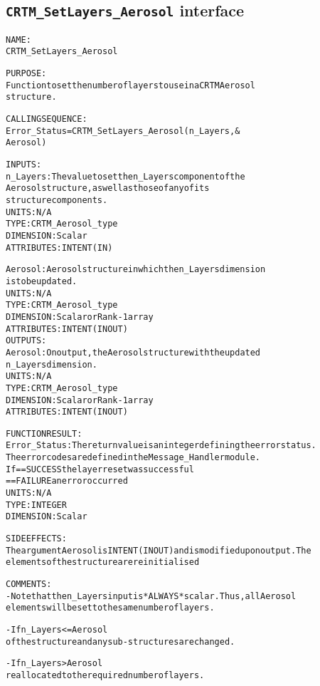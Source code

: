 \subsection{\texttt{CRTM\_SetLayers\_Aerosol} interface}
  \label{sec:CRTM_SetLayers_Aerosol_interface}
  \begin{alltt}
 
  NAME:
        CRTM_SetLayers_Aerosol
  
  PURPOSE:
        Function to set the number of layers to use in a CRTM Aerosol
        structure.
 
  CALLING SEQUENCE:
        Error_Status = CRTM_SetLayers_Aerosol( n_Layers, &
                                               Aerosol   )
 
  INPUTS:
        n_Layers:     The value to set the n_Layers component of the 
                      Aerosol structure, as well as those of any of its
                      structure components.
                      UNITS:      N/A
                      TYPE:       CRTM_Aerosol_type
                      DIMENSION:  Scalar
                      ATTRIBUTES: INTENT(IN)
 
        Aerosol:      Aerosol structure in which the n_Layers dimension
                      is to be updated.
                      UNITS:      N/A
                      TYPE:       CRTM_Aerosol_type
                      DIMENSION:  Scalar or Rank-1 array
                      ATTRIBUTES: INTENT(IN OUT)
  OUTPUTS:
        Aerosol:      On output, the Aerosol structure with the updated
                      n_Layers dimension.
                      UNITS:      N/A
                      TYPE:       CRTM_Aerosol_type
                      DIMENSION:  Scalar or Rank-1 array
                      ATTRIBUTES: INTENT(IN OUT)
 
  FUNCTION RESULT:
        Error_Status: The return value is an integer defining the error status.
                      The error codes are defined in the Message_Handler module.
                      If == SUCCESS the layer reset was successful
                         == FAILURE an error occurred
                      UNITS:      N/A
                      TYPE:       INTEGER
                      DIMENSION:  Scalar
 
  SIDE EFFECTS:
        The argument Aerosol is INTENT(IN OUT) and is modified upon output. The
        elements of the structureare reinitialised
 
  COMMENTS:
        - Note that the n_Layers input is *ALWAYS* scalar. Thus, all Aerosol
          elements will be set to the same number of layers.
 
        - If n_Layers <= Aerosol%Max_Layers, then only the dimension value
          of the structure and any sub-structures are changed.
 
        - If n_Layers > Aerosol%Max_Layers, then the entire structure is
          reallocated to the required number of layers.
 
  \end{alltt}
